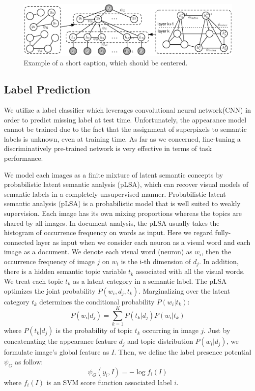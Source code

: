 \begin{figure}
    \begin{center}
        \includegraphics[width=0.95\linewidth]{graphmodel.pdf}
    \end{center}
    \caption{Example of a short caption, which should be centered.}
    \label{fig:graphmodel}
\end{figure}

\subsection{Label Prediction}
We utilize a label classifier which leverages convolutional neural network(CNN) in order to predict missing label at test time. Unfortunately, the appearance model cannot be trained due to the fact that the assignment of superpixels to semantic labels is unknown, even at training time. As far as we concerned, fine-tuning a discriminatively pre-trained network is very effective in terms of task performance.

We model each images as a finite mixture of latent semantic concepts by probabilistic latent semantic analysis (pLSA), which can recover visual models of semantic labels  in a completely unsupervised manner. Probabilistic latent semantic analysis (pLSA) is a probabilistic model that is well suited to weakly supervision. Each image has its own mixing proportions whereas the topics are shared by all images. In document analysis, the pLSA usually takes the histogram of occurrence frequency on words as input. Here we regard fully-connected layer as input when we consider each neuron as a visual word and each image as a document. We denote each visual word (neuron) as $w_i$, then the occurrence frequency of image $j$ on $w_i$ is the i-th dimension of $d_j$. In addition, there is a hidden semantic topic variable $t_k$ associated with all the visual words. We treat each topic $t_k$ as a latent category in a semantic label. The pLSA optimizes the joint probability $P(w_i,d_j,t_k)$. Marginalizing over the latent category $t_k$ determines the conditional probability $P(w_i|t_k)$:
\begin{equation}
  P(w_i|d_j) = \sum_{k=1}^K{P(t_k|d_j)P(w_i|t_k)}
\end{equation}
where $P(t_k|d_j)$ is the probability of topic $t_k$ occurring in image $j$.
Just by concatenating the appearance feature $d_j$ and topic distribution $P(w_i|d_j)$, we formulate image's global feature as $I$. Then, we define the label presence potential $\psi_{G}$ as follow:
\begin{equation}
    \psi_{G}(y_i,I) = -\log f_{i}(I)
\end{equation}
where $f_{i}(I)$ is an SVM score function associated label $i$.

